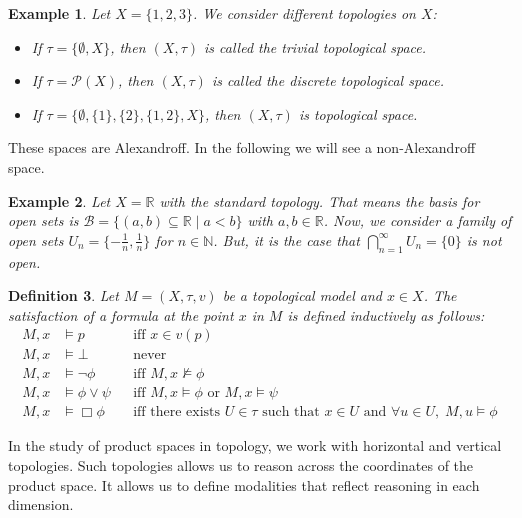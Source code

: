 \documentclass[12pt, a4paper]{scrartcl}
\newtheorem{definition}{Definition}[subsection]
\newtheorem{example}[definition]{Example}
\begin{document}
\begin{example}
Let \( X = \{1, 2, 3\} \). We consider different topologies on \( X \):

\begin{itemize}
    \item If \( \tau = \{\emptyset, X\} \), then \( (X, \tau) \) is called the trivial topological space.
    
    \item If \( \tau = \mathcal{P}(X) \), then \( (X, \tau) \) is called the discrete topological space.
    
    \item If \( \tau = \{\emptyset, \{1\}, \{2\}, \{1,2\}, X\} \), then \( (X, \tau) \) is topological space.
\end{itemize}

\end{example}
These spaces are Alexandroff. In the following we will see a non-Alexandroff space.

\begin{example}
    Let $X = \mathbb{R}$ with the standard topology. That means the basis for open sets is $\mathcal{B} = \{(a,b) \subseteq \mathbb{R} \mid a < b\}$ with $a,b \in \mathbb{R}$.
    Now, we consider a family of open sets $U_n = \{-\frac{1}{n}, \frac{1}{n}\}$ for $n \in \mathbb{N}$.
    But, it is the case that $\bigcap_{n=1}^\infty U_n = \{0\}$ is not open.

\end{example}

\begin{definition}
Let \( M = (X,\tau,v) \) be a topological model and \( x \in X \).  
The satisfaction of a formula at the point \( x \) in \( M \) is defined inductively as follows:
\[
\begin{aligned}
    M, x &\vDash p &&\text{iff } x \in v(p) \\
    M, x &\vDash \bot &&\text{never} \\
    M, x &\vDash \neg \phi &&\text{iff } M, x \nvDash \phi \\
    M, x &\vDash \phi \lor \psi &&\text{iff } M, x \vDash \phi \text{ or } M, x \vDash \psi \\
    M, x &\vDash \Box \phi &&\text{iff there exists } U \in \tau \text{ such that } x \in U \text{ and } \forall u \in U,\; M, u \vDash \phi
\end{aligned}
\]
\end{definition}

In the study of product spaces in topology, we work with horizontal and vertical topologies. 
Such topologies allows us to reason across the coordinates of the product space. It allows us to define
modalities that reflect reasoning in each dimension.
\end{document}
